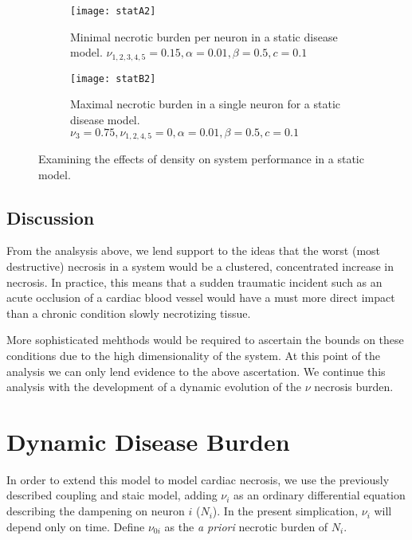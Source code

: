 \documentclass[11pt]{report}
\begin{document}
\begin{figure}
    \centering
    \begin{subfigure}[b]{0.48\textwidth}
        \texttt{[image: statA2]}
        \caption{Minimal necrotic burden per neuron in a static disease model. $\nu_{1,2,3,4,5} = 0.15, \alpha = 0.01, \beta = 0.5,c = 0.1$}
        \label{fig:statA2}
    \end{subfigure}
    \hfill %
    \begin{subfigure}[b]{0.48\textwidth}
        \texttt{[image: statB2]}
        \caption{Maximal necrotic burden in a single neuron for a static disease model. $\nu_{3} = 0.75, \nu_{1,2,4,5} = 0, \alpha = 0.01, \beta = 0.5,c = 0.1$}
        \label{fig:statB2}
    \end{subfigure}
    \caption{Examining the effects of density on system performance in a static model.}\label{fig:density}
\end{figure}


\subsection{Discussion} %
\label{sub:discussion}

From the analsysis above, we lend support to the ideas that the worst (most destructive) necrosis in a system would be a clustered, concentrated increase in necrosis. In practice, this means that a sudden traumatic incident such as an acute occlusion of a cardiac blood vessel would have a must more direct impact than a chronic condition slowly necrotizing tissue.

More sophisticated mehthods would be required to ascertain the bounds on these conditions due to the high dimensionality of the system. At this point of the analysis we can only lend evidence to the above ascertation. We continue this analysis with the development of a dynamic evolution of the $\nu$ necrosis burden. 



\section{Dynamic Disease Burden} %
\label{sub:dynamic_disease_burden}

In order to extend this model to model cardiac necrosis, we use the previously described coupling and staic model, adding $\nu_i$ as an ordinary differential equation describing the dampening on neuron $i$ ($N_i$). In the present simplication, $\nu_i$ will depend only on time. Define $\nu_{0i}$ as the \textit{a priori} necrotic burden of $N_i$. 
\end{document}
